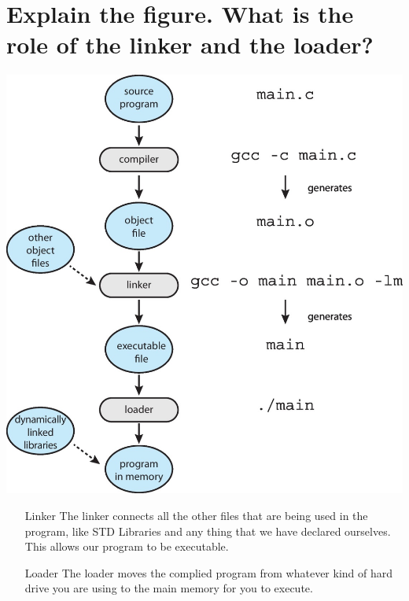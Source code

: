 \documentclass{article}
\begin{document}
\section{Explain the figure. What is the role of the linker and the loader?}
\includegraphics{linker_and_loader}
\begin{itemize}
	\item [Linker] The linker connects all the other files that are being used in the program, like STD Libraries and any thing that we have declared ourselves. This allows our program to be executable.
	\item [Loader] The loader moves the complied program from whatever kind of hard drive you are using to the main memory for you to execute. 
\end{itemize}
\end{document}
